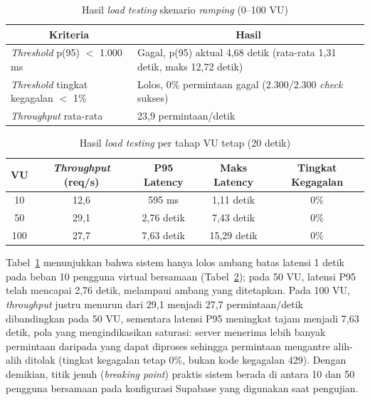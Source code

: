 \begin{table}[H]
\centering
\caption{Hasil \textit{load testing} skenario \textit{ramping} (0--100 VU)}
\label{tab:load-testing}
\renewcommand{\arraystretch}{1.3}
\begin{tabular}{|p{4.5cm}|p{9.5cm}|}
\hline
\multicolumn{1}{|c|}{\textbf{Kriteria}} & \multicolumn{1}{c|}{\textbf{Hasil}} \\
\hline
\textit{Threshold} p(95) $<$ 1.000 ms & Gagal, p(95) aktual 4,68 detik (rata-rata 1,31 detik, maks 12,72 detik) \\
\hline
\textit{Threshold} tingkat kegagalan $<$ 1\% & Lolos, 0\% permintaan gagal (2.300/2.300 \textit{check} sukses) \\
\hline
\textit{Throughput} rata-rata & 23,9 permintaan/detik \\
\hline
\end{tabular}
\end{table}

\begin{table}[H]
\centering
\caption{Hasil \textit{load testing} per tahap VU tetap (20 detik)}
\label{tab:load-testing-vu}
\renewcommand{\arraystretch}{1.3}
\begin{tabular}{|c|c|c|c|c|}
\hline
\textbf{VU} & \textbf{\textit{Throughput} (req/s)} & \textbf{P95 Latency} & \textbf{Maks Latency} & \textbf{Tingkat Kegagalan} \\
\hline
10 & 12,6 & 595 ms & 1,11 detik & 0\% \\
\hline
50 & 29,1 & 2,76 detik & 7,43 detik & 0\% \\
\hline
100 & 27,7 & 7,63 detik & 15,29 detik & 0\% \\
\hline
\end{tabular}
\end{table}

Tabel~\ref{tab:load-testing} menunjukkan bahwa sistem hanya lolos ambang batas latensi 1 detik pada beban 10 pengguna virtual bersamaan (Tabel~\ref{tab:load-testing-vu}); pada 50 VU, latensi P95 telah mencapai 2,76 detik, melampaui ambang yang ditetapkan. Pada 100 VU, \textit{throughput} justru menurun dari 29,1 menjadi 27,7 permintaan/detik dibandingkan pada 50 VU, sementara latensi P95 meningkat tajam menjadi 7,63 detik, pola yang mengindikasikan saturasi: server menerima lebih banyak permintaan daripada yang dapat diproses sehingga permintaan mengantre alih-alih ditolak (tingkat kegagalan tetap 0\%, bukan kode kegagalan 429). Dengan demikian, titik jenuh (\textit{breaking point}) praktis sistem berada di antara 10 dan 50 pengguna bersamaan pada konfigurasi Supabase yang digunakan saat pengujian.

